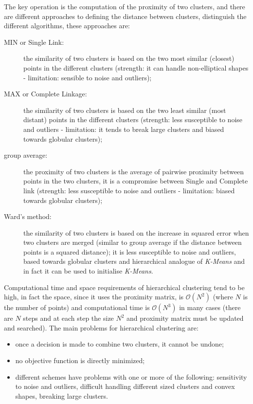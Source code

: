 \begin{description}
\begin{enumerate}
	\end{enumerate}
	The key operation is the computation of the proximity of two clusters, and there are different approaches to defining the distance between clusters, distinguish the different algorithms, these approaches are:
	\begin{description}
		\item[MIN or Single Link:] the similarity of two clusters is based on the two most similar (closest) points in the different clusters (strength: it can handle non-elliptical shapes - limitation: sensible to noise and outliers);
		\item[MAX or Complete Linkage:] the similarity of two clusters is based on the two least similar (most distant) points in the different clusters (strength: less susceptible to noise and outliers - limitation: it tends to break large clusters and biased towards globular clusters);
		\item[group average:] the proximity of two clusters is the average of pairwise proximity between points in the two clusters, it is a compromise between Single and Complete link (strength: less susceptible to noise and outliers - limitation: biased towards globular clusters);
		\item[Ward's method:] the similarity of two clusters is based on the increase in squared error when two clusters are merged (similar to group average if the distance between points is a squared distance); it is less susceptible to noise and outliers, based towards globular clusters and hierarchical analogue of \emph{K-Means} and in fact it can be used to initialise \emph{K-Means}.
	\end{description}
	Computational time and space requirements of hierarchical clustering tend to be high, in fact the space, since it uses the proximity matrix, is $\mathcal{O}\left(N^2\right)$ (where $N$ is the number of points) and computational time is $\mathcal{O}\left(N^3\right)$ in many cases (there are $N$ steps and at each step the size $N^2$ and proximity matrix must be updated and searched).
	The main problems for hierarchical clustering are:
	\begin{itemize}
		\item
		once a decision is made to combine two clusters, it cannot be undone;
		\item
		no objective function is directly minimized;
		\item
		different schemes have problems with one or more of the following: sensitivity to noise and outliers, difficult handling different sized clusters and convex shapes, breaking large clusters.

\end{itemize}
\end{description}
